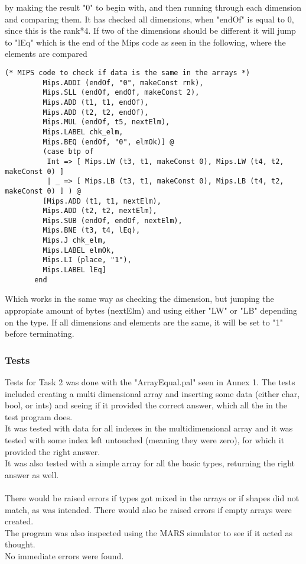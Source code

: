\documentclass[12pt]{article}
\begin{document}
\endgroup
by making the result "0" to begin with, and then running through each dimension and comparing them. It has checked all dimensions, when "endOf" is equal to 0, since this is the rank*4. If two of the dimensions should be different it will jump to "lEq" which is the end of the Mips code as seen in the following, where the elements are compared
\begingroup
    \fontsize{9pt}{12pt}\selectfont
    \begin{verbatim}
(* MIPS code to check if data is the same in the arrays *)
         Mips.ADDI (endOf, "0", makeConst rnk),
         Mips.SLL (endOf, endOf, makeConst 2),
         Mips.ADD (t1, t1, endOf),
         Mips.ADD (t2, t2, endOf),
         Mips.MUL (endOf, t5, nextElm),
         Mips.LABEL chk_elm,
         Mips.BEQ (endOf, "0", elmOk)] @ 
         (case btp of 
          Int => [ Mips.LW (t3, t1, makeConst 0), Mips.LW (t4, t2, makeConst 0) ]
          | _ => [ Mips.LB (t3, t1, makeConst 0), Mips.LB (t4, t2, makeConst 0) ] ) @
         [Mips.ADD (t1, t1, nextElm),
         Mips.ADD (t2, t2, nextElm),
         Mips.SUB (endOf, endOf, nextElm),
         Mips.BNE (t3, t4, lEq),
         Mips.J chk_elm,
         Mips.LABEL elmOk,
         Mips.LI (place, "1"),
         Mips.LABEL lEq]
       end
    \end{verbatim}
\endgroup
Which works in the same way as checking the dimension, but jumping the appropiate amount of bytes (nextElm) and using either "LW" or "LB" depending on the type. If all dimensions and elements are the same, it will be set to "1" before terminating.

\subsubsection{Tests}
Tests for Task 2 was done with the "ArrayEqual.pal" seen in Annex 1. The tests included creating a multi dimensional array and inserting some data (either char, bool, or ints) and seeing if it provided the correct answer, which all the in the test program does.\\
It was tested with data for all indexes in the multidimensional array and it was tested with some index left untouched (meaning they were zero), for which it provided the right answer.\\
It was also tested with a simple array for all the basic types, returning the right answer as well.\\
\\
There would be raised errors if types got mixed in the arrays or if shapes did not match, as was intended. There would also be raised errors if empty arrays were created. \\
The program was also inspected using the MARS simulator to see if it acted as thought. \\
No immediate errors were found.
\end{document}
